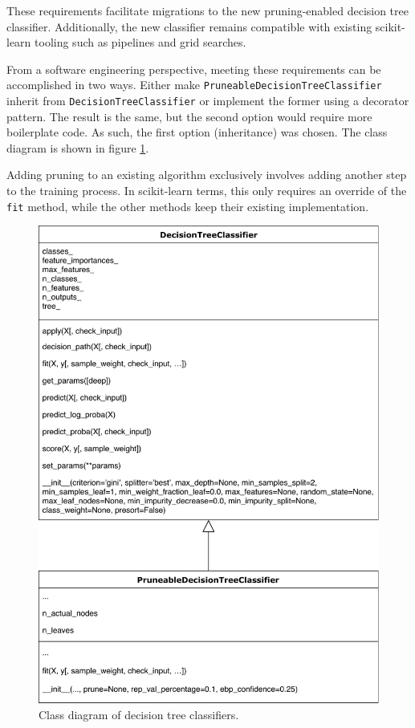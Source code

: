 These requirements facilitate migrations to the new pruning-enabled decision tree classifier. Additionally, the new classifier remains compatible with existing scikit-learn tooling such as pipelines and grid searches.

From a software engineering perspective, meeting these requirements can be accomplished in two ways. Either make \texttt{PruneableDecisionTreeClassifier} inherit from \texttt{DecisionTreeClassifier} or implement the former using a decorator pattern. The result is the same, but the second option would require more boilerplate code. As such, the first option (inheritance) was chosen. The class diagram is shown in figure \ref{fig:classifier_classes}.

Adding pruning to an existing algorithm exclusively involves adding another step to the training process. In scikit-learn terms, this only requires an override of the \texttt{fit} method, while the other methods keep their existing implementation.

\begin{figure}[htp]
    \centering
    \includegraphics[width=\textwidth]{img/DecisionTreeClasses.pdf}
    \caption{Class diagram of decision tree classifiers.}%
    \label{fig:classifier_classes}
\end{figure}

